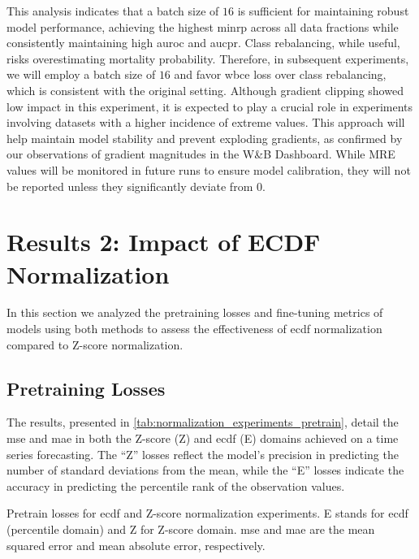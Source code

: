 This analysis indicates that a batch size of \(16\) is sufficient for maintaining robust model performance, achieving the highest \gls{minrp} across all data fractions while consistently maintaining high \gls{auroc} and \gls{aucpr}. Class rebalancing, while useful, risks overestimating mortality probability. Therefore, in subsequent experiments, we will employ a batch size of \(16\) and favor \gls{wbce} loss over class rebalancing, which is consistent with the original setting. Although gradient clipping showed low impact in this experiment, it is expected to play a crucial role in experiments involving datasets with a higher incidence of extreme values. This approach will help maintain model stability and prevent exploding gradients, as confirmed by our observations of gradient magnitudes in the W\&B Dashboard. While MRE values will be monitored in future runs to ensure model calibration, they will not be reported unless they significantly deviate from \num{0}.


\section{Results 2: Impact of ECDF Normalization}

In this section we analyzed the pretraining losses and fine-tuning metrics of models using both methods to assess the effectiveness of \gls{ecdf} normalization compared to Z-score normalization.


\subsection{Pretraining Losses}

The results, presented in \cref{tab:normalization_experiments_pretrain}, detail the \gls{mse} and \gls{mae} in both the Z-score (Z) and \gls{ecdf} (E) domains achieved on a time series forecasting. The ``Z'' losses reflect the model's precision in predicting the number of standard deviations from the mean, while the ``E'' losses indicate the accuracy in predicting the percentile rank of the observation values.

\begin{table}

\caption{Pretrain losses for \gls{ecdf} and Z-score normalization experiments. E stands for \gls{ecdf} (percentile domain) and Z for Z-score domain. \gls{mse} and \gls{mae} are the mean squared error and mean absolute error, respectively.}
\label{tab:normalization_experiments_pretrain}
\end{table}


